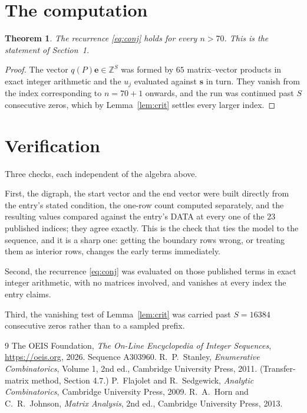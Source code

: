 \documentclass[11pt,a4paper]{article}
\theoremstyle{plain}
\newtheorem{theorem}{Theorem}
\theoremstyle{definition}
\begin{document}
\section{The computation}

\begin{theorem}
The recurrence \eqref{eq:conj} holds for every $n>70$. This is the statement of
Section~1.
\end{theorem}

\begin{proof}
The vector $q(P)\mathbf{e}\in\mathbb{Z}^{S}$ was formed by $65$ matrix--vector
products in exact integer arithmetic and the $u_j$ evaluated against $\mathbf{s}$ in turn.
They vanish from the index corresponding to $n=70+1$ onwards, and the run was continued
past $S$ consecutive zeros, which by Lemma~\ref{lem:crit} settles every larger index.
\end{proof}

\section{Verification}

Three checks, each independent of the algebra above.

First, the digraph, the start vector and the end vector were built directly from the
entry's stated condition, the one-row count computed separately, and the resulting values
compared against the entry's DATA at every one of the $23$ published indices; they
agree exactly. This is the check that ties the model to the sequence, and it is a sharp one:
getting the boundary rows wrong, or treating them as interior rows, changes the early terms
immediately.

Second, the recurrence \eqref{eq:conj} was evaluated on those published terms in exact
integer arithmetic, with no matrices involved, and vanishes at every index the entry claims.

Third, the vanishing test of Lemma~\ref{lem:crit} was carried past $S=16384$ consecutive
zeros rather than to a sampled prefix.

\begin{thebibliography}{9}
 The OEIS Foundation, \emph{The On-Line Encyclopedia of Integer
Sequences}, \url{https://oeis.org}, 2026. Sequence A303960.
 R.~P.~Stanley, \emph{Enumerative Combinatorics}, Volume 1, 2nd ed.,
Cambridge University Press, 2011. (Transfer-matrix method, Section 4.7.)
 P.~Flajolet and R.~Sedgewick, \emph{Analytic Combinatorics}, Cambridge
University Press, 2009.
 R.~A.~Horn and C.~R.~Johnson, \emph{Matrix Analysis}, 2nd ed., Cambridge
University Press, 2013.
\end{thebibliography}
\end{document}
